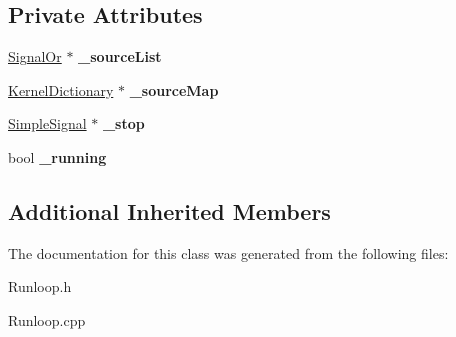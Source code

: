 \subsection*{Private Attributes}
\begin{DoxyCompactItemize}
\item 
\mbox{\label{class_runloop_a4140570af9a6aa78565cc09280daa7ed}} 
\hyperlink{class_signal_or}{Signal\+Or} $\ast$ {\bfseries \+\_\+source\+List}
\item 
\mbox{\label{class_runloop_a416e85cfc5c9c07f220626c560727838}} 
\hyperlink{class_kernel_dictionary}{Kernel\+Dictionary} $\ast$ {\bfseries \+\_\+source\+Map}
\item 
\mbox{\label{class_runloop_a14c2ffd2bc8361e57dd1eececd87c844}} 
\hyperlink{class_simple_signal}{Simple\+Signal} $\ast$ {\bfseries \+\_\+stop}
\item 
\mbox{\label{class_runloop_a5b0825df04ced7f0e48facf2fd9006f7}} 
bool {\bfseries \+\_\+running}
\end{DoxyCompactItemize}
\subsection*{Additional Inherited Members}


The documentation for this class was generated from the following files\+:\begin{DoxyCompactItemize}
\item 
Runloop.\+h\item 
Runloop.\+cpp\end{DoxyCompactItemize}
